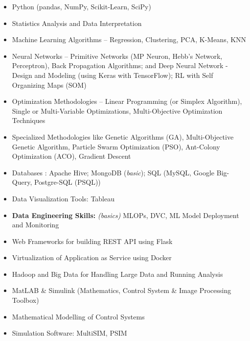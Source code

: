 
%




\begin{multicols}{2}
	\begin{itemize}
		\item Python (pandas, NumPy, Scikit-Learn, SciPy)
		\item Statistics Analysis and Data Interpretation
		\item Machine Learning Algorithms – Regression, Clustering, PCA, K-Means, KNN
		\item Neural Networks – Primitive Networks (MP Neuron, Hebb’s Network, Perceptron), Back Propagation Algorithms; and Deep Neural Network - Design and Modeling (using Keras with TensorFlow); RL with Self Organizing Maps (SOM)
		\item Optimization Methodologies – Linear Programming (or Simplex Algorithm), Single or Multi-Variable Optimizations, Multi-Objective Optimization Techniques
		\item \nohyphens{Specialized Methodologies like Genetic Algorithms (GA), Multi-Objective Genetic Algorithm, Particle Swarm Optimization (PSO), Ant-Colony Optimization (ACO), Gradient Descent}
		\item Databases : Apache Hive; MongoDB (\textit{basic}); SQL (MySQL, Google Big-Query, Postgre-SQL (PSQL))
		\item Data Visualization Tools: Tableau
		\item \textbf{Data Engineering Skills:} \textit{(basics)} MLOPs, DVC, ML Model Deployment and Monitoring
	\end{itemize}

	\begin{itemize}
		\item Web Frameworks for building REST API using Flask
		\item Virtualization of Application as Service using Docker
		\item Hadoop and Big Data for Handling Large Data and Running Analysis
		\item MatLAB \& Simulink (Mathematics, Control System \& Image Processing Toolbox)
		\item Mathematical Modelling of Control Systems
		\item Simulation Software: MultiSIM, PSIM
	\end{itemize}
\end{multicols}